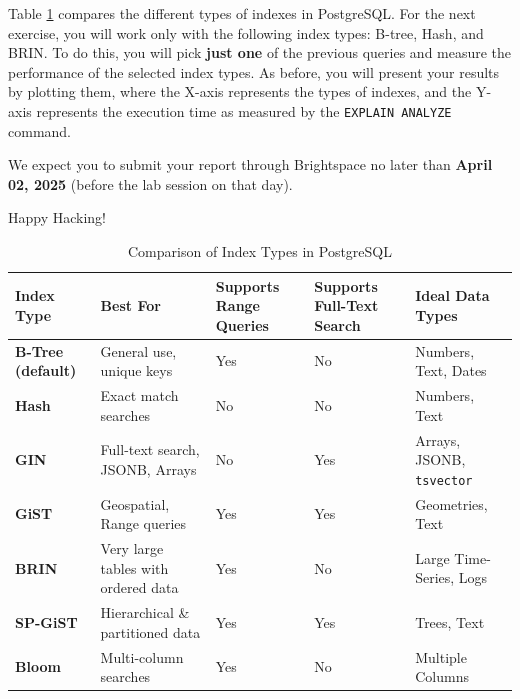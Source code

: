 \documentclass{article}
\begin{document}
Table \ref{tab:postgresql_indexes} compares the different types of indexes in PostgreSQL. For the next exercise, you will work only with the following index types: B-tree, Hash, and BRIN. To do this, you will pick \textbf{just one} of the previous queries and measure the performance of the selected index types. As before, you will present your results by plotting them, where the X-axis represents the types of indexes, and the Y-axis represents the execution time as measured by the \texttt{EXPLAIN ANALYZE} command.

We expect you to submit your report through Brightspace\texttrademark{} no later than \textbf{April 02, 2025} (before the lab session on that day).

\vspace{5mm}
Happy Hacking! 

\begin{table}
    \centering
    \renewcommand{\arraystretch}{1.3}
    \begin{tabular}{p{1.75cm} p{4cm} p{2cm} p{2cm} p{4cm}}
		\toprule
        \textbf{Index Type} & \textbf{Best For} & \textbf{Supports Range Queries} & \textbf{Supports Full-Text Search} & \textbf{Ideal Data Types} \\
        \midrule
        \textbf{B-Tree (default)} & General use, unique keys & Yes & No & Numbers, Text, Dates \\
        \textbf{Hash} & Exact match searches & No & No & Numbers, Text \\
        \textbf{GIN} & Full-text search, JSONB, Arrays & No & Yes & Arrays, JSONB, \texttt{tsvector} \\
        \textbf{GiST} & Geospatial, Range queries & Yes & Yes & Geometries, Text \\
        \textbf{BRIN} & Very large tables with ordered data & Yes & No & Large Time-Series, Logs \\
        \textbf{SP-GiST} & Hierarchical \& partitioned data & Yes & Yes & Trees, Text \\
        \textbf{Bloom} & Multi-column searches & Yes & No & Multiple Columns \\
        \bottomrule
    \end{tabular}
    \caption{Comparison of Index Types in PostgreSQL}
    \label{tab:postgresql_indexes}
\end{table}
\end{document}
